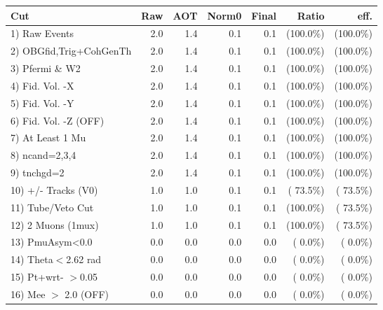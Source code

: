  \begin{table}[h!]\centering
 \begin{tabular}{||l||r|r|r|r|r|r||}
 \hline
 \hline
 Cut & Raw & AOT & Norm0 & Final & Ratio & eff.       \\
 \hline
  1) Raw Events           &          2.0 &          1.4 &          0.1 &          0.1 & (100.0\%) & (100.0\%) \\
  2) OBGfid,Trig+CohGenTh &          2.0 &          1.4 &          0.1 &          0.1 & (100.0\%) & (100.0\%) \\
  3) Pfermi \& W2         &          2.0 &          1.4 &          0.1 &          0.1 & (100.0\%) & (100.0\%) \\
  4) Fid. Vol. -X         &          2.0 &          1.4 &          0.1 &          0.1 & (100.0\%) & (100.0\%) \\
  5) Fid. Vol. -Y         &          2.0 &          1.4 &          0.1 &          0.1 & (100.0\%) & (100.0\%) \\
  6) Fid. Vol. -Z (OFF)   &          2.0 &          1.4 &          0.1 &          0.1 & (100.0\%) & (100.0\%) \\
  7) At Least 1 Mu        &          2.0 &          1.4 &          0.1 &          0.1 & (100.0\%) & (100.0\%) \\
  8) ncand=2,3,4          &          2.0 &          1.4 &          0.1 &          0.1 & (100.0\%) & (100.0\%) \\
  9) tnchgd=2             &          2.0 &          1.4 &          0.1 &          0.1 & (100.0\%) & (100.0\%) \\
 10) +/- Tracks (V0)      &          1.0 &          1.0 &          0.1 &          0.1 & ( 73.5\%) & ( 73.5\%) \\
 11) Tube/Veto Cut        &          1.0 &          1.0 &          0.1 &          0.1 & (100.0\%) & ( 73.5\%) \\
 12) 2 Muons (1mux)       &          1.0 &          1.0 &          0.1 &          0.1 & (100.0\%) & ( 73.5\%) \\
 13) PmuAsym<0.0          &          0.0 &          0.0 &          0.0 &          0.0 & (  0.0\%) & (  0.0\%) \\
 14) Theta$<$2.62 rad     &          0.0 &          0.0 &          0.0 &          0.0 & (  0.0\%) & (  0.0\%) \\
 15) Pt+wrt- $>$0.05      &          0.0 &          0.0 &          0.0 &          0.0 & (  0.0\%) & (  0.0\%) \\
 16) Mee $>$ 2.0  (OFF)   &          0.0 &          0.0 &          0.0 &          0.0 & (  0.0\%) & (  0.0\%) \\

\end{tabular}
\end{table}
